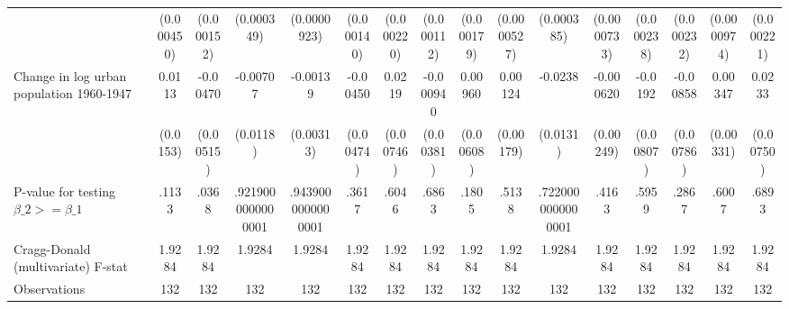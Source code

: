 {\begin{tabular}{l*{15}{c}}
                &(0.000450)         &(0.000152)         &(0.000349)         &(0.0000923)         &(0.000140)         &(0.000220)         &(0.000112)         &(0.000179)         &(0.0000527)         &(0.000385)         &(0.0000733)         &(0.000238)         &(0.000232)         &(0.0000974)         &(0.000221)         \\
[1em]
Change in log urban population 1960-1947&   0.0113         & -0.00470         & -0.00707         & -0.00139         & -0.00450         &   0.0219\sym{***}&-0.000940         &  0.00960         &  0.00124         &  -0.0238\sym{*}  &-0.000620         &  -0.0192\sym{**} & -0.00858         &  0.00347         &   0.0233\sym{***}\\
                & (0.0153)         &(0.00515)         & (0.0118)         &(0.00313)         &(0.00474)         &(0.00746)         &(0.00381)         &(0.00608)         &(0.00179)         & (0.0131)         &(0.00249)         &(0.00807)         &(0.00786)         &(0.00331)         &(0.00750)         \\
\hline
P-value for testing $\beta\_{2} >= \beta\_{1}$&    .1133         &    .0368         &.9219000000000001         &.9439000000000001         &    .3617         &    .6046         &    .6863         &    .1805         &    .5138         &.7220000000000001         &    .4163         &    .5959         &    .2867         &    .6007         &    .6893         \\
Cragg-Donald (multivariate) F-stat&   1.9284         &   1.9284         &   1.9284         &   1.9284         &   1.9284         &   1.9284         &   1.9284         &   1.9284         &   1.9284         &   1.9284         &   1.9284         &   1.9284         &   1.9284         &   1.9284         &   1.9284         \\
Observations    &      132         &      132         &      132         &      132         &      132         &      132         &      132         &      132         &      132         &      132         &      132         &      132         &      132         &      132         &      132         \\
\hline\hline
\end{tabular}
}
